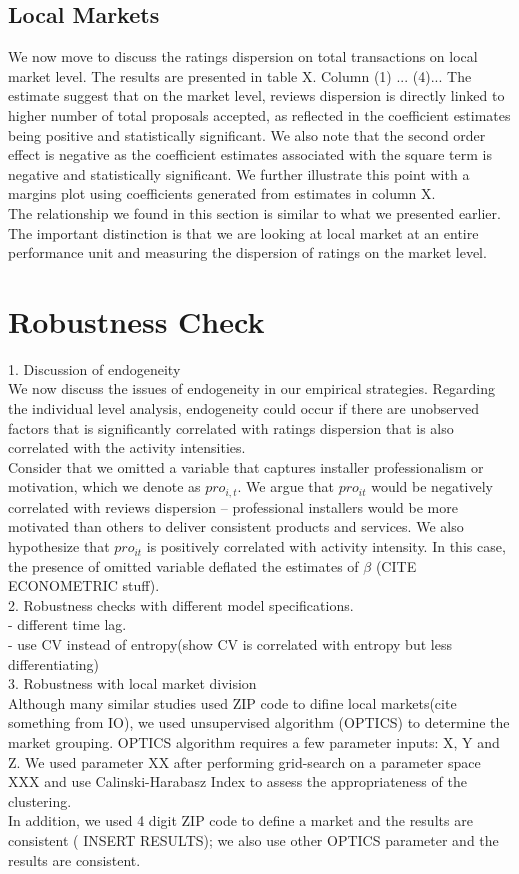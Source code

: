 \documentclass[msom,blindrev]{informs3}
\begin{document}
\subsection{Local Markets}
We now move to discuss the ratings dispersion on total transactions on local market level. The results are presented in table X. Column (1) ... (4)... The estimate suggest that on the market level, reviews dispersion is directly linked to higher number of total proposals accepted, as reflected in the coefficient estimates being positive and statistically significant. We also note that the second order effect is negative as the coefficient estimates associated with the square term is negative and statistically significant. We further illustrate this point with a margins plot using coefficients generated from estimates in column X. \\
The relationship we found in this section is similar to what we presented earlier. The important distinction is that we are looking at local market at an entire performance unit and measuring the dispersion of ratings on the market level.  
\section{Robustness Check}
1. Discussion of endogeneity \\
We now discuss the issues of endogeneity in our empirical strategies. Regarding the individual level analysis, endogeneity could occur if there are unobserved factors that is significantly correlated with ratings dispersion that is also correlated with the activity intensities.\\
Consider that we omitted a variable that captures installer professionalism or motivation, which we denote as $pro_{i,t}$. We argue that $pro_{it}$ would be negatively correlated with reviews dispersion -- professional installers would be more motivated than others to deliver consistent products and services. We also hypothesize that  $pro_{it}$ is positively correlated with activity intensity. In this case, the presence of omitted variable deflated the estimates of $\beta$ (CITE ECONOMETRIC stuff). \\
2. Robustness checks with different model specifications.  \\
- different time lag.  \\
- use CV instead of entropy(show CV is correlated with entropy but less differentiating) \\ 

3. Robustness with local market division\\
Although many similar studies used ZIP code to difine local markets(cite something from IO), we used unsupervised algorithm (OPTICS) to determine the market grouping. OPTICS algorithm requires a few parameter inputs: X, Y and Z. We used parameter XX after performing grid-search on a parameter space XXX and use Calinski-Harabasz Index to assess the appropriateness of the clustering.  \\ In addition, we used 4 digit ZIP code to define a market and the results are consistent ( INSERT RESULTS); we also use other OPTICS parameter and the results are consistent.  
\onecolumn
\end{document}

